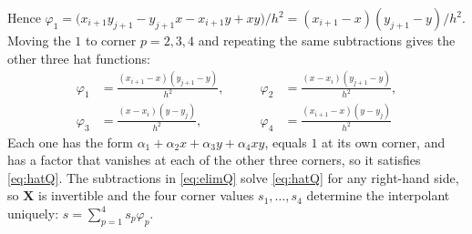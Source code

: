 \documentclass[11pt]{article}
\begin{document}
Hence
$\varphi_{1}=\bigl(x_{i+1}y_{j+1}-y_{j+1}x-x_{i+1}y+xy\bigr)/h^{2}
=(x_{i+1}-x)(y_{j+1}-y)/h^{2}$.  Moving the $1$ to corner $p=2,3,4$ and
repeating the same subtractions gives the other three hat functions:
\begin{equation}\label{eq:hatsQ}
  \boxed{\begin{aligned}
    \varphi_{1}&=\frac{(x_{i+1}-x)(y_{j+1}-y)}{h^{2}}, &\qquad
    \varphi_{2}&=\frac{(x-x_{i})(y_{j+1}-y)}{h^{2}},\\[2pt]
    \varphi_{3}&=\frac{(x-x_{i})(y-y_{j})}{h^{2}}, &\qquad
    \varphi_{4}&=\frac{(x_{i+1}-x)(y-y_{j})}{h^{2}}
  \end{aligned}}
\end{equation}
Each one has the form $\alpha_{1}+\alpha_{2}x+\alpha_{3}y+\alpha_{4}xy$, equals $1$ at its own corner, and has a
factor that vanishes at each of the other three corners, so it satisfies
\eqref{eq:hatQ}.  The subtractions in \eqref{eq:elimQ} solve
\eqref{eq:hatQ} for any right-hand side, so $\bm X$ is invertible and the
four corner values $s_{1},\dots,s_{4}$ determine the interpolant uniquely:
$s=\sum_{p=1}^{4}s_{p}\varphi_{p}$.
\end{document}
